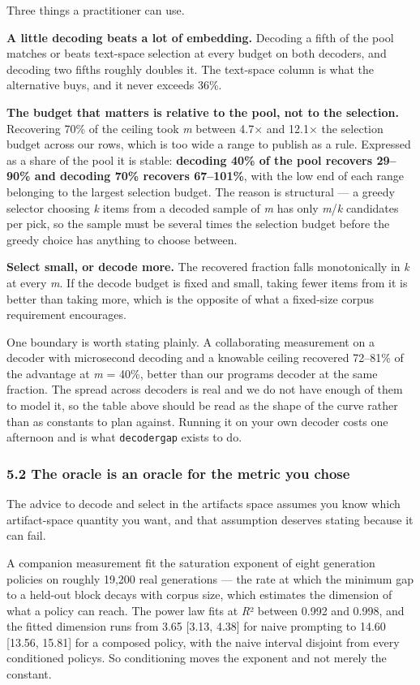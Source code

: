 \documentclass[
  10pt,
]{article}
\theoremstyle{plain}
\theoremstyle{definition}
\begin{document}
Three things a practitioner can use.

\textbf{A little decoding beats a lot of embedding.} Decoding a fifth of
the pool matches or beats text-space selection at every budget on both
decoders, and decoding two fifths roughly doubles it. The text-space
column is what the alternative buys, and it never exceeds 36\%.

\textbf{The budget that matters is relative to the pool, not to the
selection.} Recovering 70\% of the ceiling took \emph{m} between 4.7×
and 12.1× the selection budget across our rows, which is too wide a
range to publish as a rule. Expressed as a share of the pool it is
stable: \textbf{decoding 40\% of the pool recovers 29--90\% and decoding
70\% recovers 67--101\%}, with the low end of each range belonging to
the largest selection budget. The reason is structural --- a greedy
selector choosing \emph{k} items from a decoded sample of \emph{m} has
only \emph{m}/\emph{k} candidates per pick, so the sample must be
several times the selection budget before the greedy choice has anything
to choose between.

\textbf{Select small, or decode more.} The recovered fraction falls
monotonically in \emph{k} at every \emph{m}. If the decode budget is
fixed and small, taking fewer items from it is better than taking more,
which is the opposite of what a fixed-size corpus requirement
encourages.

One boundary is worth stating plainly. A collaborating measurement on a
decoder with microsecond decoding and a knowable ceiling recovered
72--81\% of the advantage at \emph{m} = 40\%, better than our programs
decoder at the same fraction. The spread across decoders is real and we
do not have enough of them to model it, so the table above should be
read as the shape of the curve rather than as constants to plan against.
Running it on your own decoder costs one afternoon and is what
\texttt{decodergap} exists to do.

\subsubsection{5.2 The oracle is an oracle for the metric you
chose}\label{52-the-oracle-is-an-oracle-for-the-metric-you-chose}

The advice to decode and select in the artifact\textquotesingle s space
assumes you know which artifact-space quantity you want, and that
assumption deserves stating because it can fail.

A companion measurement fit the saturation exponent of eight generation
policies on roughly 19,200 real generations --- the rate at which the
minimum gap to a held-out block decays with corpus size, which estimates
the dimension of what a policy can reach. The power law fits at
\emph{R}² between 0.992 and 0.998, and the fitted dimension runs from
3.65 {[}3.13, 4.38{]} for naive prompting to 14.60 {[}13.56, 15.81{]}
for a composed policy, with the naive interval disjoint from every
conditioned policy\textquotesingle s. So conditioning moves the exponent
and not merely the constant.
\end{document}

